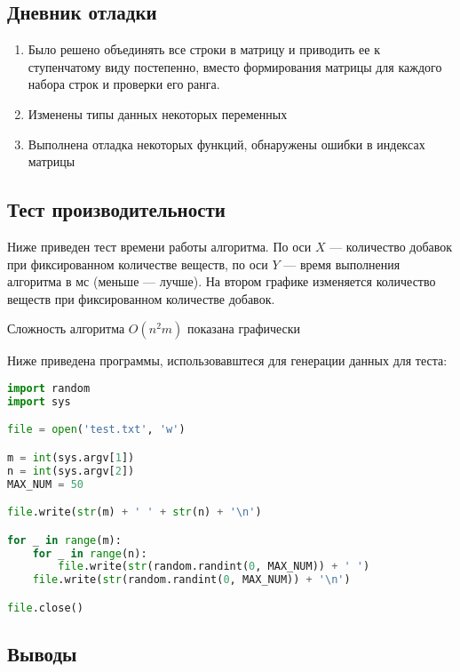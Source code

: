 \documentclass[12pt]{article}
\begin{document}
\subsection*{Дневник отладки}

\begin{enumerate}
    \item Было решено объединять все строки в матрицу и приводить ее к ступенчатому виду постепенно, вместо формирования матрицы для каждого набора строк и проверки его ранга.
    \item Изменены типы данных некоторых переменных
    \item Выполнена отладка некоторых функций, обнаружены ошибки в индексах
    матрицы
\end{enumerate}

\subsection*{Тест производительности}

Ниже приведен тест времени работы алгоритма. По оси $X$ — количество 
добавок при фиксированном количестве веществ, по оси $Y$ — время выполнения алгоритма в мс (меньше — лучше).
На втором графике изменяется количество веществ при фиксированном количестве добавок.




Сложность алгоритма $O(n^2m)$ показана графически

Ниже приведена программы, использовавштеся для генерации данных для теста:

\begin{lstlisting}[language=Python]
import random
import sys

file = open('test.txt', 'w')

m = int(sys.argv[1])
n = int(sys.argv[2])
MAX_NUM = 50

file.write(str(m) + ' ' + str(n) + '\n')

for _ in range(m):
    for _ in range(n):
        file.write(str(random.randint(0, MAX_NUM)) + ' ')
    file.write(str(random.randint(0, MAX_NUM)) + '\n')

file.close()
\end{lstlisting}


\subsection*{Выводы}
\end{document}
